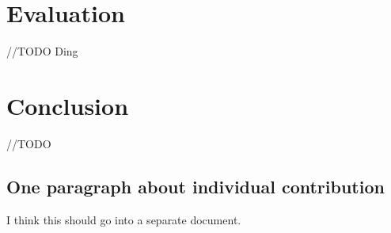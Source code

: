 \documentclass{sigchi}
\begin{document}
\section{Evaluation}
//TODO Ding


\section{Conclusion}
//TODO

\subsection{One paragraph about individual
contribution}
I think this should go into a separate document.

\balance{}



\end{document}

